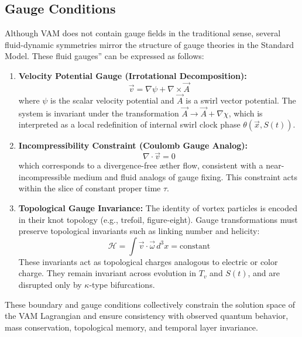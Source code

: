 \subsection{Gauge Conditions}

Although VAM does not contain gauge fields in the traditional sense, several fluid-dynamic symmetries mirror the structure of gauge theories in the Standard Model. These \grqq fluid gauges\textquotedblright{} can be expressed as follows:

\begin{enumerate}
    \item \textbf{Velocity Potential Gauge (Irrotational Decomposition):}
    \[
        \vec{v} = \nabla \psi + \nabla \times \vec{A}
    \]
    where $\psi$ is the scalar velocity potential and $\vec{A}$ is a swirl vector potential. The system is invariant under the transformation $\vec{A} \to \vec{A} + \nabla \chi$, which is interpreted as a local redefinition of internal swirl clock phase $\theta(\vec{x}, S(t))$.

    \item \textbf{Incompressibility Constraint (Coulomb Gauge Analog):}
    \[
        \nabla \cdot \vec{v} = 0
    \]
    which corresponds to a divergence-free \ae{}ther flow, consistent with a near-incompressible medium and fluid analogs of gauge fixing. This constraint acts within the slice of constant proper time $\tau$.

    \item \textbf{Topological Gauge Invariance:}
    The identity of vortex particles is encoded in their knot topology (e.g., trefoil, figure-eight). Gauge transformations must preserve topological invariants such as linking number and helicity:
    \[
        \mathcal{H} = \int \vec{v} \cdot \vec{\omega} \, d^3x = \text{constant}
    \]
    These invariants act as topological charges analogous to electric or color charge. They remain invariant across evolution in $T_v$ and $S(t)$, and are disrupted only by $\kappa$-type bifurcations.
\end{enumerate}

These boundary and gauge conditions collectively constrain the solution space of the VAM Lagrangian and ensure consistency with observed quantum behavior, mass conservation, topological memory, and temporal layer invariance.